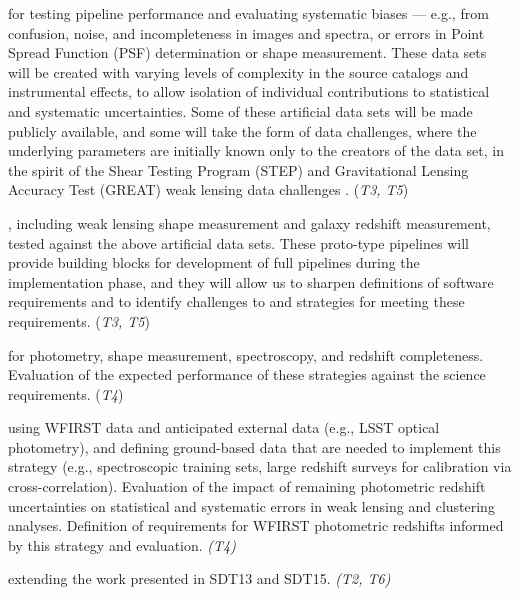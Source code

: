 for testing pipeline
performance and evaluating systematic biases --- e.g., from confusion,
noise, and incompleteness in images and spectra, or errors in Point
Spread Function (PSF) determination or shape measurement.
These data sets will be created with varying levels of complexity
in the source catalogs and instrumental effects, to allow isolation
of individual contributions to statistical and systematic uncertainties.
Some of these artificial data sets will be made publicly available,
and some will take the form of data challenges, where the underlying
parameters are initially known only to the creators of the data set,
in the spirit of the Shear Testing Program (STEP) and Gravitational
Lensing Accuracy Test (GREAT) weak lensing data
challenges \cite{Heymans2006, Massey2007, Bridle2010, Kitching2012, Mandelbaum2015}. 
 (\textit{T3, T5})

, including weak lensing
shape measurement and galaxy redshift measurement, tested against the
above artificial data sets.  These proto-type pipelines will provide
building blocks for development of full pipelines during the implementation
phase, and they will allow us to sharpen definitions of software
requirements and to identify challenges to and strategies for meeting
these requirements. (\textit{T3, T5})

 for photometry, shape measurement, spectroscopy,
and redshift completeness.  Evaluation of the expected performance of these
strategies against the science requirements. (\textit{T4})

using WFIRST data and anticipated external data (e.g., LSST optical
photometry), and defining ground-based data that are needed to
implement this strategy (e.g., spectroscopic training sets, large
redshift surveys for calibration via cross-correlation).
Evaluation of the impact of remaining photometric redshift uncertainties
on statistical and systematic errors in weak lensing and clustering analyses.
Definition of requirements for WFIRST photometric redshifts informed
by this strategy and evaluation. \textit{(T4)}

 extending the work presented in SDT13 and SDT15. \textit{(T2, T6)}


